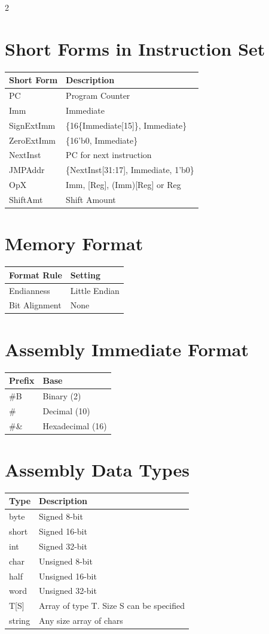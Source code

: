 \documentclass[a4paper,10pt]{article}
\begin{document}
\begin{multicols}{2}
\section*{Short Forms in Instruction Set}
\begin{tabular}{ll}
\toprule
Short Form & Description\\
\midrule
PC & Program Counter\\
Imm & Immediate\\
SignExtImm & \{16\{Immediate[15]\}, Immediate\} \\
ZeroExtImm & \{16'b0, Immediate\} \\
NextInst & PC for next instruction \\
JMPAddr & \{NextInst[31:17], Immediate, 1'b0\} \\
OpX & Imm, [Reg], (Imm)[Reg] or Reg\\
ShiftAmt & Shift Amount\\
\bottomrule
\end{tabular}

\section*{Memory Format}
\begin{tabular}{ll}
\toprule
Format Rule & Setting\\
\midrule
Endianness & Little Endian\\
Bit Alignment & None\\
\bottomrule
\end{tabular}

\section*{Assembly Immediate Format}
\begin{tabular}{ll}
\toprule
Prefix & Base\\
\midrule
\#B & Binary (2)\\
\# & Decimal (10)\\
\#\& & Hexadecimal (16)\\
\bottomrule
\end{tabular}

\section*{Assembly Data Types}
\begin{tabular}{ll}
\toprule
Type & Description\\
\midrule
byte & Signed 8-bit\\
short & Signed 16-bit\\
int & Signed 32-bit\\
char & Unsigned 8-bit\\
half & Unsigned 16-bit\\
word & Unsigned 32-bit\\
T[S] & Array of type T. Size S can be specified\\
string & Any size array of chars\\
\bottomrule
\end{tabular}

\end{multicols}
\end{document}
